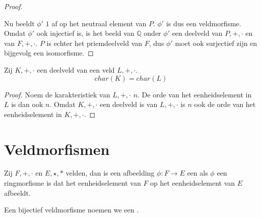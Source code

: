 \documentclass[main.tex]{subfiles}
\begin{document}
\begin{st}
\begin{proof}
    \begin{figure}[H]
      \centering
    \end{figure}
    Nu beeldt $\phi'$ $1$ af op het neutraal element van $P$.
    $\phi'$ is dus een veldmorfisme.
    Omdat $\phi'$ ook injectief is, is het beeld van $\mathbb{Q}$ onder $\phi'$ een deelveld van $P,+,\cdot$ en van $F,+,\cdot$.
    $P$ is echter het priemdeelveld van $F$, dus $\phi'$ moet ook surjectief zijn en bijgevolg een isomorfisme.
  \end{proof}
\end{st}

\begin{st}
  Zij $K,+,\cdot$ een deelveld van een veld $L,+,\cdot$.
  \[ char(K) = char(L) \]

  \begin{proof}
    Noem de karakteristiek van $L,+,\cdot$ $n$.
    De orde van het eenheidselement in $L$ is dan ook $n$.
    Omdat $K,+,\cdot$ een deelveld is van $L,+,\cdot$ is $n$ ook de orde van het eenheidselement in $K,+,\cdot$.
  \end{proof}
\end{st}

\section{Veldmorfismen}
\label{sec:veldmorfismen}

\begin{de}
  Zij $F,+,\cdot$ en $E,\star,*$ velden, dan is een afbeelding $\phi: F \rightarrow E$ een  als $\phi$ een ringmorfisme is dat het eenheidselement van $F$ op het eenheidselement van $E$ afbeeldt.
\end{de}

\begin{de}
  Een bijectief veldmorfisme noemen we een .
\end{de}
\end{document}
